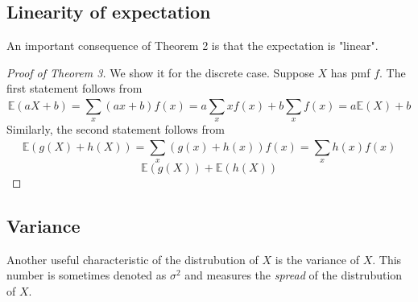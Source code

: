 \documentclass{report}
\theoremstyle{definition}
\newtheorem{definition}{Definition}
\theoremstyle{plain}
\newtheorem{theorem}{Theorem}
\theoremstyle{remark}
\begin{document}
\subsection{Linearity of expectation}
An important consequence of Theorem 2 is that the expectation is "linear".
\begin{center}
\end{center}
\begin{proof}[Proof of Theorem 3] 
  We show it for the discrete case. Suppose $ X $ has pmf $ f $. The first
  statement follows from
  $$ \mathbb{E}(aX+b) = \displaystyle \sum_{x}^{} (ax+b)f(x) = a \displaystyle
  \sum_{x}^{} xf(x) + b \displaystyle \sum_{x}^{} f(x) = a \mathbb{E}(X) + b $$
  Similarly, the second statement follows from
  $$ \mathbb{E}(g(X) + h(X)) = \displaystyle \sum_{x}^{} (g(x) + h(x))f(x)
  = \displaystyle \sum_{x}^{} h(x)f(x)$$
  $$ \mathbb{E}(g(X)) + \mathbb{E}(h(X)) $$
\end{proof}
  \subsection{Variance}
  Another useful characteristic of the distrubution of $ X $ is the variance of
  $ X $. This number is sometimes denoted as $ \sigma^2 $ and measures the
  \textit{spread} of the distrubution of $ X $.
  \begin{center}
  \end{center}
\end{document}

